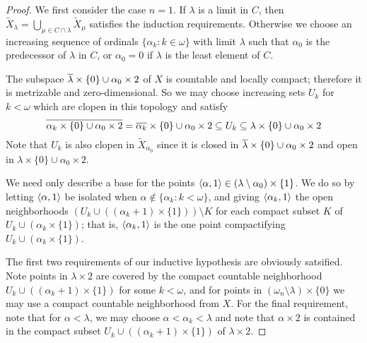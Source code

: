 \documentclass{amsart}
\theoremstyle{plain}
\theoremstyle{definition}
\theoremstyle{remark}
\theoremstyle{plain}
\theoremstyle{definition}
\theoremstyle{remark}
\begin{document}
\begin{proof}
    We first consider the case \(n=1\).
    If \(\lambda\) is a limit in \(C\), then
    \(
      \tilde X_\lambda
        =
      \bigcup_{\mu\in C\cap\lambda}\tilde X_\mu
    \)
    satisfies the induction requirements.
    Otherwise we choose an increasing sequence of
    ordinals \(\{\alpha_k : k\in \omega\}\) with limit \(\lambda\)
    such that \(\alpha_0\) is the predecessor of \(\lambda\) in \(C\),
    or \(\alpha_0=0\) if \(\lambda\) is the least element of \(C\).

    The subspace \(\overline{\lambda}\times\{0\}\cup\alpha_0\times2\) of \(X\)
    is countable and locally compact; therefore it is
    metrizable and zero-dimensional.
    So we may choose increasing sets \(U_k\) for \(k<\omega\) which are
    clopen in this topology and satisfy
    \[
      \overline{\alpha_k\times\{0\}\cup\alpha_0\times2}
        =
      \overline{\alpha_k}\times\{0\}\cup\alpha_0\times2
        \subseteq
      U_k
        \subseteq
      \lambda\times\{0\}\cup\alpha_0\times 2
    \]
    Note that \(U_k\) is also clopen in \(\tilde X_{\alpha_0}\) since it is
    closed in \(\overline{\lambda}\times\{0\}\cup\alpha_0\times2\) and open in
    \(\lambda\times\{0\}\cup\alpha_0\times 2\).

    We need only describe a base for the points
    \(\langle\alpha,1\rangle\in(\lambda\setminus\alpha_0)\times\{1\}\).
    We do so by letting
    \(\langle\alpha,1\rangle\) be isolated when \(\alpha\not\in\{\alpha_k:k<\omega\}\),
    and giving \(\langle\alpha_k,1\rangle\) the open neighborhoods
    \((U_k\cup((\alpha_k+1)\times\{1\}))\setminus K\) for each compact
    subset \(K\) of \(U_k\cup(\alpha_k\times\{1\})\); that is,
    \(\langle\alpha_k,1\rangle\) is the one point compactifying
    \(U_k\cup(\alpha_k\times\{1\})\).

    The first two requirements of our inductive hypothesis are obviously
    satsified. Note points in \(\lambda\times 2\) are covered by
    the compact countable neighborhood \(U_k\cup((\alpha_k+1)\times\{1\})\)
    for some \(k<\omega\), and for points in
    \((\omega_n\setminus\lambda)\times\{0\}\) we may use a compact
    countable neighborhood from \(X\).
    For the final requirement, note that for \(\alpha<\lambda\), we may
    choose \(\alpha<\alpha_k<\lambda\) and note that
    \(\alpha\times 2\) is contained in the compact
    subset \(U_k\cup((\alpha_k+1)\times\{1\})\) of \(\lambda\times2\).


\end{proof}
\end{document}

